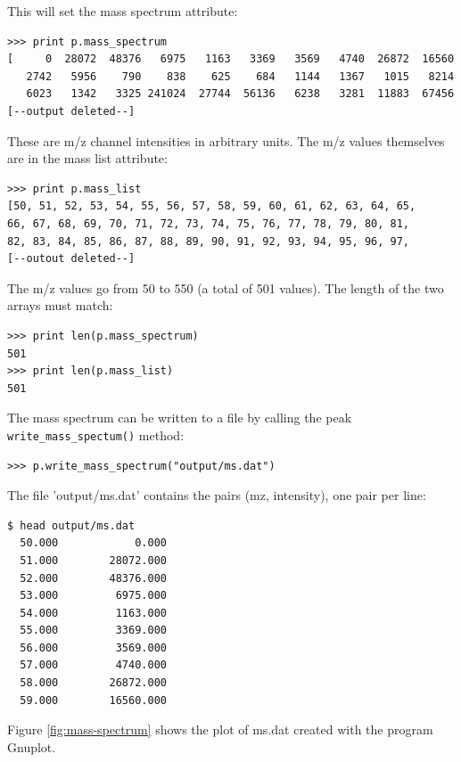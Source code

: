 \noindent
This will set the mass spectrum attribute: 

\begin{verbatim}
>>> print p.mass_spectrum
[     0  28072  48376   6975   1163   3369   3569   4740  26872  16560
   2742   5956    790    838    625    684   1144   1367   1015   8214
   6023   1342   3325 241024  27744  56136   6238   3281  11883  67456
[--output deleted--]
\end{verbatim}

\noindent
These are m/z channel intensities in arbitrary units. The m/z values
themselves are in the mass list attribute:

\begin{verbatim}
>>> print p.mass_list
[50, 51, 52, 53, 54, 55, 56, 57, 58, 59, 60, 61, 62, 63, 64, 65,
66, 67, 68, 69, 70, 71, 72, 73, 74, 75, 76, 77, 78, 79, 80, 81,
82, 83, 84, 85, 86, 87, 88, 89, 90, 91, 92, 93, 94, 95, 96, 97,
[--outout deleted--]
\end{verbatim}

\noindent
The m/z values go from 50 to 550 (a total of 501 values).  The length of
the two arrays must match:

\begin{verbatim}
>>> print len(p.mass_spectrum)
501
>>> print len(p.mass_list)
501
\end{verbatim}

The mass spectrum can be written to a file by calling the peak
{\tt write\_mass\_spectum()} method:

\begin{verbatim}
>>> p.write_mass_spectrum("output/ms.dat")
\end{verbatim}

\noindent
The file 'output/ms.dat' contains the pairs (mz, intensity), one pair
per line:

\begin{verbatim}
$ head output/ms.dat
  50.000            0.000
  51.000        28072.000
  52.000        48376.000
  53.000         6975.000
  54.000         1163.000
  55.000         3369.000
  56.000         3569.000
  57.000         4740.000
  58.000        26872.000
  59.000        16560.000
\end{verbatim}

Figure \ref{fig:mass-spectrum} shows the plot of ms.dat created with the
program Gnuplot.

